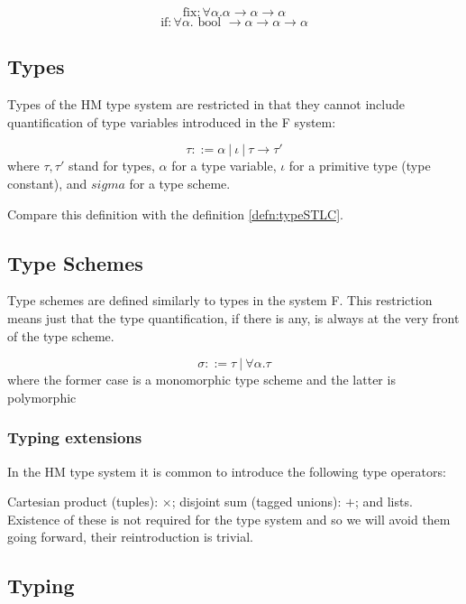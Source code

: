 $$\text{fix}: \forall \alpha . \alpha \rightarrow \alpha \rightarrow \alpha$$
$$\text{if}: \forall \alpha . \text{ bool } \rightarrow \alpha \rightarrow \alpha \rightarrow \alpha$$

\subsection{Types}

Types of the HM type system are restricted in that they cannot include quantification of type variables introduced in the F system:

\begin{defn}[Type]
    $$\tau ::= \alpha\ |\ \iota\ |\ \tau \rightarrow \tau'$$
    where $\tau, \tau'$ stand for types, $\alpha$ for a type variable, $\iota$ for a primitive type (type constant), and $sigma$ for a type scheme.
\end{defn}

Compare this definition with the definition \ref{defn:typeSTLC}.

\subsection{Type Schemes}

Type schemes are defined similarly to types in the system F. This restriction means just that the type quantification, if there is any, is always at the very front of the type scheme.

\begin{defn}
    \label{defn:schemeHM}
    $$\sigma ::= \tau\ |\ \forall \alpha . \tau$$
    where the former case is a monomorphic type scheme and the latter is polymorphic
\end{defn}

\subsubsection{Typing extensions}

In the HM type system it is common to introduce the following type operators:

Cartesian product (tuples): $\times$; disjoint sum (tagged unions): $+$; and lists. Existence of these is not required for the type system and so we will avoid them going forward, their reintroduction is trivial.

\subsection{Typing}

